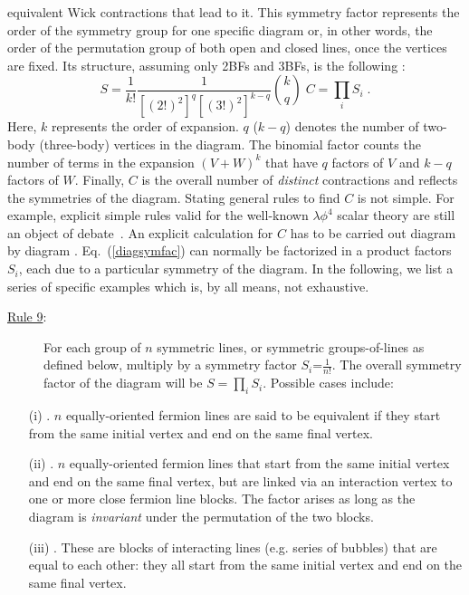 equivalent Wick contractions that lead to it. This symmetry factor 
represents the order of the symmetry group for one specific diagram or, in other words, 
the order of the permutation group of both open and closed lines, once the vertices are fixed. 
Its structure, assuming only 2BFs and 3BFs, is the following :
\begin{equation}
S=\frac{1}{k!}\frac{1} {[(2!)^2]^{q} [(3!)^2]^{k-q} }\binom{k}{q} \; C
= \prod_i S_i \; .
\label{diagsymfac}
\end{equation}
Here, $k$ represents the order of expansion. 
$q$ ($k-q$) denotes the number of two-body (three-body) vertices in the diagram.
The binomial factor counts the number of terms in the expansion $(V+W)^k$ 
that have $q$ factors of $V$ and $k-q$ factors of $W$.
Finally, $C$ is  the overall number of \emph{distinct} contractions and reflects 
the symmetries of the diagram. Stating general rules to find $C$ is not simple. 
For example, explicit simple rules valid for the well-known $\lambda \phi^4$ scalar  theory are still 
an object of debate~\cite{ch11_Feyn_rules}. 
An explicit calculation for $C$ has to be carried out diagram by diagram 
\cite{ch11_Feyn_rules}. Eq.~(\ref{diagsymfac}) can normally be factorized in a product factors $S_i$,
each due to a particular symmetry of the diagram. In the following, we list a series of specific examples which is,
by all  means, not exhaustive.
\begin{description}
 \item[\underline{Rule 9}:]  For each group of $n$ symmetric lines, or symmetric groups-of-lines as defined below, multiply by a symmetry factor $S_i$=$\frac{1}{n!}$. The overall symmetry factor of the diagram will be $S=\prod_i S_i$.
Possible cases include:
  \end{description}
\begin{itemize}
 \item[(i)].  
 $n$ equally-oriented fermion lines are said to be equivalent if they start from the same initial vertex and end on the same final vertex.
 \item[(ii)].  
 $n$ equally-oriented fermion lines that start from the same initial vertex and end on the same final 
 vertex, but are linked via an interaction vertex to one or more close fermion line blocks. 
 The factor arises as long as the diagram is {\em invariant} under the permutation of the two blocks.
 \item[(iii)]. 
 These are blocks of interacting lines (e.g. series of bubbles) that are equal to each other: 
           they all start from the same initial vertex and end on the same final vertex.
 \end{itemize} 

